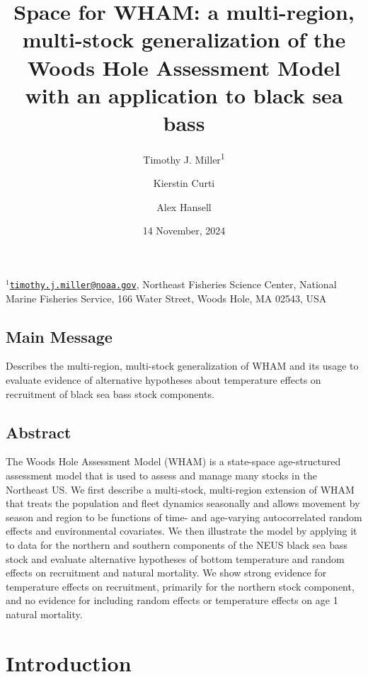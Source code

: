 \documentclass[
]{article}
\title{Space for WHAM: a multi-region, multi-stock generalization of the
Woods Hole Assessment Model with an application to black sea bass}
\author{Timothy J. Miller\textsuperscript{1} \and Kierstin
Curti \and Alex Hansell}
\date{14 November, 2024}
\begin{document}
\maketitle

\(^1\)\href{mailto:timothy.j.miller@noaa.gov}{\nolinkurl{timothy.j.miller@noaa.gov}},
Northeast Fisheries Science Center, National Marine Fisheries Service,
166 Water Street, Woods Hole, MA 02543, USA\\

\pagebreak

\hypertarget{main-message}{%
\subsection*{Main Message}\label{main-message}}

Describes the multi-region, multi-stock generalization of WHAM and its
usage to evaluate evidence of alternative hypotheses about temperature
effects on recruitment of black sea bass stock components.

\hypertarget{abstract}{%
\subsection*{Abstract}\label{abstract}}

The Woods Hole Assessment Model (WHAM) is a state-space age-structured
assessment model that is used to assess and manage many stocks in the
Northeast US. We first describe a multi-stock, multi-region extension of
WHAM that treats the population and fleet dynamics seasonally and allows
movement by season and region to be functions of time- and age-varying
autocorrelated random effects and environmental covariates. We then
illustrate the model by applying it to data for the northern and
southern components of the NEUS black sea bass stock and evaluate
alternative hypotheses of bottom temperature and random effects on
recruitment and natural mortality. We show strong evidence for
temperature effects on recruitment, primarily for the northern stock
component, and no evidence for including random effects or temperature
effects on age 1 natural mortality.

\pagebreak

\hypertarget{introduction}{%
\section*{Introduction}\label{introduction}}
\end{document}
